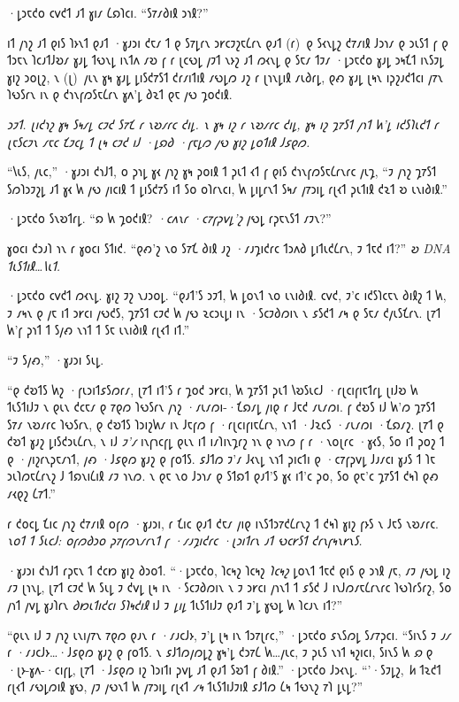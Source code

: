 ·𐑛𐑮𐑱𐑒𐑴 𐑤𐑫𐑒𐑑 𐑨𐑑 𐑣𐑦𐑥 𐑖𐑸𐑐𐑤𐑦. “𐑕𐑳𐑥𐑔𐑦𐑙 𐑮𐑪𐑙?”

𐑦𐑑 𐑢𐑪𐑟 𐑨𐑑 𐑞𐑦𐑕 𐑐𐑶𐑯𐑑 𐑞𐑨𐑑 ·𐑣𐑨𐑮𐑦 𐑒𐑱𐑥 𐑑 𐑞 𐑕𐑳𐑛𐑩𐑯 𐑮𐑾𐑤𐑲𐑟𐑱𐑖𐑩𐑯 𐑞𐑨𐑑 (𐑩)~𐑞 𐑕𐑬𐑯𐑛𐑟 𐑒𐑳𐑥𐑦𐑙 𐑓𐑮𐑪𐑥 𐑞 𐑮𐑧𐑕𐑑 𐑝 𐑞 𐑑𐑮𐑱𐑯 𐑐𐑤𐑨𐑑𐑓𐑹𐑥 𐑣𐑨𐑛 𐑑𐑻𐑯𐑛 𐑦𐑯𐑑𐑵 𐑥𐑹 𐑝 𐑩 𐑚𐑤𐑻𐑛 𐑢𐑲𐑑 𐑯𐑶𐑟 𐑨𐑑 𐑼𐑬𐑯𐑛 𐑞 𐑕𐑱𐑥 𐑑𐑲𐑥 ·𐑛𐑮𐑱𐑒𐑴 𐑣𐑨𐑛 𐑮𐑰𐑗𐑑 𐑦𐑯𐑕𐑲𐑛 𐑣𐑦𐑟 𐑮𐑴𐑚𐑟, 𐑯 (𐑚)~𐑢𐑧𐑯 𐑣𐑰 𐑣𐑨𐑛 𐑛𐑦𐑕𐑒𐑳𐑕𐑑 𐑒𐑩𐑥𐑦𐑑𐑦𐑙 𐑥𐑻𐑛𐑼 𐑨𐑟 𐑩 𐑚𐑪𐑯𐑛𐑦𐑙 𐑥𐑧𐑔𐑩𐑛, 𐑞𐑺 𐑣𐑨𐑛 𐑚𐑰𐑯 𐑦𐑜𐑟𐑨𐑒𐑑𐑤𐑦 𐑢𐑳𐑯 𐑐𐑻𐑕𐑩𐑯 𐑦𐑯 𐑞 𐑒𐑪𐑯𐑝𐑼𐑕𐑱𐑖𐑩𐑯 𐑣𐑵'𐑛 𐑔𐑷𐑑 𐑞𐑱 𐑢𐑻 𐑡𐑴𐑒𐑦𐑙.

\emph{𐑮𐑲𐑑. 𐑚𐑦𐑒𐑪𐑟 𐑣𐑰 \emph{𐑕𐑰𐑥𐑛} 𐑤𐑲𐑒 𐑕𐑳𐑗 𐑩 𐑯𐑹𐑥𐑩𐑤 𐑒𐑦𐑛. 𐑯 𐑣𐑰 \emph{𐑦𐑟} 𐑩 𐑯𐑹𐑥𐑩𐑤 𐑒𐑦𐑛, 𐑣𐑰 𐑦𐑟 𐑡𐑳𐑕𐑑 𐑢𐑪𐑑 𐑿'𐑛 \emph{𐑦𐑒𐑕𐑐𐑧𐑒𐑑} 𐑩 𐑚𐑱𐑕𐑤𐑲𐑯 𐑥𐑱𐑤 𐑗𐑲𐑤𐑛 𐑑 𐑚𐑰 𐑤𐑲𐑒 𐑦𐑓 ·𐑛𐑸𐑔 ·𐑝𐑱𐑛𐑼 𐑢𐑻 𐑣𐑦𐑟 𐑛𐑴𐑑𐑦𐑙 𐑓𐑭𐑞𐑼.}
                            
“𐑘𐑧𐑕, 𐑢𐑧𐑤,” ·𐑣𐑨𐑮𐑦 𐑒𐑪𐑓𐑑, 𐑴 𐑜𐑪𐑛 𐑣𐑬 𐑢𐑪𐑟 𐑣𐑰 𐑜𐑴𐑦𐑙 𐑑 𐑜𐑧𐑑 𐑬𐑑 𐑝 𐑞𐑦𐑕 𐑒𐑪𐑯𐑝𐑼𐑕𐑱𐑖𐑩𐑯𐑩𐑤 𐑢𐑧𐑡, “𐑲 𐑢𐑪𐑟 𐑡𐑳𐑕𐑑 𐑕𐑼𐑐𐑮𐑲𐑟𐑛 𐑨𐑑 𐑣𐑬 𐑿 𐑢𐑻 𐑢𐑦𐑤𐑦𐑙 𐑑 𐑛𐑦𐑕𐑒𐑳𐑕 𐑦𐑑 𐑕𐑴 𐑴𐑐𐑩𐑯𐑤𐑦, 𐑿 𐑛𐑦𐑛𐑩𐑯𐑑 𐑕𐑰𐑥 𐑢𐑳𐑮𐑦𐑛 𐑩𐑚𐑬𐑑 𐑜𐑧𐑑𐑦𐑙 𐑒𐑷𐑑 𐑹 𐑧𐑯𐑦𐑔𐑦𐑙.”

·𐑛𐑮𐑱𐑒𐑴 𐑕𐑯𐑹𐑑𐑩𐑛. “𐑸 𐑿 𐑡𐑴𐑒𐑦𐑙? \emph{·𐑤𐑵𐑯𐑩 ·𐑤𐑳𐑝𐑜𐑫𐑛'𐑟} 𐑢𐑻𐑛 𐑩𐑜𐑱𐑯𐑕𐑑 𐑥𐑲𐑯?”

𐑣𐑴𐑤𐑦 𐑒𐑮𐑨𐑐 𐑪𐑯 𐑩 𐑣𐑴𐑤𐑦 𐑕𐑑𐑦𐑒. “𐑞𐑺'𐑟 𐑯𐑴 𐑕𐑳𐑗 𐑔𐑦𐑙 𐑨𐑟 ·𐑥𐑨𐑡𐑦𐑒𐑩𐑤 𐑑𐑮𐑵𐑔 𐑛𐑦𐑑𐑧𐑒𐑖𐑩𐑯, 𐑲 𐑑𐑱𐑒 𐑦𐑑?” \emph{𐑹 DNA 𐑑𐑧𐑕𐑑𐑦𐑙…𐑘𐑧𐑑.}

·𐑛𐑮𐑱𐑒𐑴 𐑤𐑫𐑒𐑑 𐑼𐑬𐑯𐑛. 𐑣𐑦𐑟 𐑲𐑟 𐑯𐑨𐑮𐑴𐑛. “𐑞𐑨𐑑'𐑕 𐑮𐑲𐑑, 𐑿 𐑛𐑴𐑯𐑑 𐑯𐑴 𐑧𐑯𐑦𐑔𐑦𐑙. 𐑤𐑫𐑒, 𐑲'𐑤 𐑦𐑒𐑕𐑐𐑤𐑱𐑯 𐑔𐑦𐑙𐑟 𐑑 𐑿, 𐑲 𐑥𐑰𐑯 𐑞 𐑢𐑱 𐑦𐑑 𐑮𐑾𐑤𐑦 𐑢𐑻𐑒𐑕, 𐑡𐑳𐑕𐑑 𐑤𐑲𐑒 𐑿 𐑢𐑻 𐑷𐑤𐑮𐑧𐑛𐑦 𐑦𐑯 ·𐑕𐑤𐑲𐑔𐑼𐑦𐑯 𐑯 𐑭𐑕𐑒𐑑 𐑥𐑰 𐑞 𐑕𐑱𐑥 𐑒𐑢𐑧𐑕𐑗𐑩𐑯. 𐑚𐑳𐑑 𐑿'𐑝 𐑜𐑪𐑑 𐑑 𐑕𐑢𐑺 𐑯𐑪𐑑 𐑑 𐑕𐑱 𐑧𐑯𐑦𐑔𐑦𐑙 𐑩𐑚𐑬𐑑 𐑦𐑑.”

“𐑲 𐑕𐑢𐑺,” ·𐑣𐑨𐑮𐑦 𐑕𐑧𐑛.

“𐑞 𐑒𐑹𐑑𐑕 𐑿𐑟 ·𐑝𐑧𐑮𐑦𐑑𐑭𐑕𐑼𐑩𐑥, 𐑚𐑳𐑑 𐑦𐑑'𐑕 𐑩 𐑡𐑴𐑒 𐑮𐑾𐑤𐑦, 𐑿 𐑡𐑳𐑕𐑑 𐑜𐑧𐑑 𐑘𐑹𐑕𐑧𐑤𐑓 ·𐑩𐑚𐑤𐑦𐑝𐑦𐑱𐑑𐑩𐑛 𐑚𐑦𐑓𐑹 𐑿 𐑑𐑧𐑕𐑑𐑦𐑓𐑲 𐑯 𐑞𐑧𐑯 𐑒𐑤𐑱𐑥 𐑞 𐑳𐑞𐑼 𐑐𐑻𐑕𐑩𐑯 𐑢𐑪𐑟 ·𐑥𐑧𐑥𐑼𐑦-·𐑗𐑸𐑥𐑛 𐑢𐑦𐑞 𐑩 𐑓𐑱𐑒 𐑥𐑧𐑥𐑼𐑦. 𐑝 𐑒𐑹𐑕 𐑦𐑓 𐑿'𐑼 𐑡𐑳𐑕𐑑 𐑕𐑳𐑥 𐑯𐑹𐑥𐑩𐑤 𐑐𐑻𐑕𐑩𐑯, 𐑞 𐑒𐑹𐑑𐑕 𐑐𐑮𐑦𐑟𐑿𐑥 𐑦𐑯 𐑓𐑱𐑝𐑼 𐑝 ·𐑩𐑚𐑤𐑦𐑝𐑦𐑱𐑖𐑩𐑯, 𐑯𐑪𐑑 ·𐑓𐑷𐑤𐑕 ·𐑥𐑧𐑥𐑼𐑦 ·𐑗𐑸𐑥𐑟. 𐑚𐑳𐑑 𐑞 𐑒𐑹𐑑 𐑣𐑨𐑟 𐑛𐑦𐑕𐑒𐑮𐑧𐑖𐑩𐑯, 𐑯 𐑦𐑓 \emph{𐑲'𐑥} 𐑦𐑯𐑝𐑪𐑤𐑝𐑛 𐑞𐑧𐑯 𐑦𐑑 𐑦𐑥𐑐𐑦𐑯𐑡𐑩𐑟 𐑪𐑯 𐑞 𐑪𐑯𐑼 𐑝 𐑩 ·𐑯𐑴𐑚𐑩𐑤 ·𐑣𐑬𐑕, 𐑕𐑴 𐑦𐑑 𐑜𐑴𐑟 𐑑 𐑞 ·𐑢𐑦𐑟𐑩𐑯𐑜𐑱𐑥𐑪𐑑, 𐑢𐑺 ·𐑓𐑭𐑞𐑼 𐑣𐑨𐑟 𐑞 𐑝𐑴𐑑𐑕. 𐑭𐑓𐑑𐑼 𐑲'𐑥 𐑓𐑬𐑯𐑛 𐑯𐑪𐑑 𐑜𐑦𐑤𐑑𐑦 𐑞 ·𐑤𐑳𐑝𐑜𐑫𐑛 𐑓𐑨𐑥𐑤𐑦 𐑣𐑨𐑕 𐑑 𐑐𐑱 𐑮𐑧𐑐𐑼𐑱𐑖𐑩𐑯𐑟 𐑓 𐑑𐑸𐑯𐑦𐑖𐑦𐑙 𐑥𐑲 𐑪𐑯𐑼. 𐑯 𐑞𐑱 𐑯𐑴 𐑓𐑮𐑪𐑥 𐑞 𐑕𐑑𐑸𐑑 𐑞𐑨𐑑'𐑕 𐑣𐑬 𐑦𐑑'𐑤 𐑜𐑴, 𐑕𐑴 𐑞𐑱'𐑤 𐑡𐑳𐑕𐑑 𐑒𐑰𐑐 𐑞𐑺 𐑥𐑬𐑞𐑟 𐑖𐑳𐑑.”

𐑩 𐑒𐑴𐑤𐑛 𐑗𐑦𐑤 𐑢𐑪𐑟 𐑒𐑳𐑥𐑦𐑙 𐑴𐑝𐑼 ·𐑣𐑨𐑮𐑦, 𐑩 𐑗𐑦𐑤 𐑞𐑨𐑑 𐑒𐑱𐑥 𐑢𐑦𐑞 𐑦𐑯𐑕𐑑𐑮𐑳𐑒𐑖𐑩𐑯𐑟 𐑑 𐑒𐑰𐑐 𐑣𐑦𐑟 𐑝𐑶𐑕 𐑯 𐑓𐑱𐑕 𐑯𐑹𐑥𐑩𐑤. \emph{𐑯𐑴𐑑 𐑑 𐑕𐑧𐑤𐑓: 𐑴𐑝𐑼𐑔𐑮𐑴 𐑜𐑳𐑝𐑼𐑯𐑥𐑩𐑯𐑑 𐑝 ·𐑥𐑨𐑡𐑦𐑒𐑩𐑤 ·𐑚𐑮𐑦𐑑𐑩𐑯 𐑨𐑑 𐑻𐑤𐑾𐑕𐑑 𐑒𐑩𐑯𐑝𐑰𐑯𐑾𐑯𐑕.}

·𐑣𐑨𐑮𐑦 𐑒𐑪𐑓𐑑 𐑩𐑜𐑱𐑯 𐑑 𐑒𐑤𐑽 𐑣𐑦𐑟 𐑔𐑮𐑴𐑑. “·𐑛𐑮𐑱𐑒𐑴, 𐑐𐑤𐑰𐑟 𐑐𐑤𐑰𐑟 \emph{𐑐𐑤𐑰𐑟} 𐑛𐑴𐑯𐑑 𐑑𐑱𐑒 𐑞𐑦𐑕 𐑞 𐑮𐑪𐑙 𐑢𐑱, 𐑥𐑲 𐑢𐑻𐑛 𐑦𐑟 𐑥𐑲 𐑚𐑪𐑯𐑛, 𐑚𐑳𐑑 𐑤𐑲𐑒 𐑿 𐑕𐑧𐑛 𐑲 𐑒𐑫𐑛 𐑚𐑰 𐑦𐑯 ·𐑕𐑤𐑲𐑔𐑼𐑦𐑯 𐑯 𐑲 𐑮𐑾𐑤𐑦 𐑢𐑪𐑯𐑑 𐑑 𐑭𐑕𐑒 𐑓 𐑦𐑯𐑓𐑼𐑥𐑱𐑖𐑩𐑯𐑩𐑤 𐑐𐑻𐑐𐑩𐑕𐑩𐑟, 𐑕𐑴 𐑢𐑪𐑑 𐑢𐑫𐑛 𐑣𐑨𐑐𐑩𐑯 \emph{𐑔𐑽𐑧𐑑𐑦𐑒𐑤𐑦 𐑕𐑐𐑰𐑒𐑦𐑙} 𐑦𐑓 𐑲 \emph{𐑛𐑦𐑛} 𐑑𐑧𐑕𐑑𐑦𐑓𐑲 𐑞𐑨𐑑 𐑲'𐑛 𐑣𐑻𐑛 𐑿 𐑐𐑤𐑨𐑯 𐑦𐑑?”

“𐑞𐑧𐑯 𐑦𐑓 𐑲 𐑢𐑪𐑟 𐑧𐑯𐑦𐑢𐑳𐑯 𐑳𐑞𐑼 𐑞𐑨𐑯 𐑩 ·𐑥𐑨𐑤𐑓𐑶, 𐑲'𐑛 𐑚𐑰 𐑦𐑯 𐑑𐑮𐑳𐑚𐑩𐑤,” ·𐑛𐑮𐑱𐑒𐑴 𐑭𐑯𐑕𐑼𐑛 𐑕𐑥𐑳𐑜𐑤𐑦. “𐑕𐑦𐑯𐑕 𐑲 \emph{𐑨𐑥} 𐑩 ·𐑥𐑨𐑤𐑓𐑶…·𐑓𐑭𐑞𐑼 𐑣𐑨𐑟 𐑞 𐑝𐑴𐑑𐑕. 𐑯 𐑭𐑓𐑑𐑼𐑢𐑼𐑛𐑟 𐑣𐑰'𐑛 𐑒𐑮𐑳𐑖 𐑿…𐑢𐑧𐑤, 𐑲 𐑜𐑧𐑕 𐑯𐑪𐑑 𐑰𐑟𐑦𐑤𐑦, 𐑕𐑦𐑯𐑕 𐑿 \emph{𐑸} 𐑞 ·𐑚𐑶-𐑣𐑵-·𐑤𐑦𐑝𐑛, 𐑚𐑳𐑑 ·𐑓𐑭𐑞𐑼 𐑦𐑟 𐑐𐑮𐑦𐑑𐑦 𐑜𐑫𐑛 𐑨𐑑 𐑞𐑨𐑑 𐑕𐑹𐑑 𐑝 𐑔𐑦𐑙.” ·𐑛𐑮𐑱𐑒𐑴 𐑓𐑮𐑬𐑯𐑛. “'·𐑕𐑲𐑛𐑟, \emph{𐑿} 𐑑𐑷𐑒𐑑 𐑩𐑚𐑬𐑑 𐑥𐑻𐑛𐑼𐑦𐑙 𐑣𐑻, 𐑢𐑲 𐑢𐑻𐑯𐑑 𐑿 𐑢𐑳𐑮𐑦𐑛 𐑩𐑚𐑬𐑑 \emph{𐑥𐑰} 𐑑𐑧𐑕𐑑𐑦𐑓𐑲𐑦𐑙 𐑭𐑓𐑑𐑼 𐑖𐑰 𐑑𐑻𐑯𐑟 𐑳𐑐 𐑛𐑧𐑛?”


